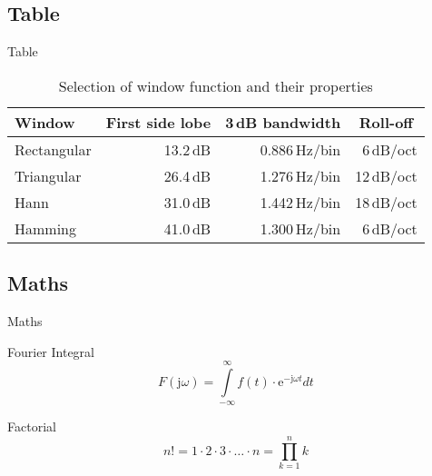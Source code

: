 \documentclass[compress]{beamer}
\begin{document}
\subsection{Table}
\begin{frame}{Table}
\begin{table}[]
	\caption{Selection of window function and their properties}
	\begin{tabular}[]{lrrr}
		\toprule
		\textbf{Window}			& \multicolumn{1}{c}{\textbf{First side lobe}}	
		                    & \multicolumn{1}{c}{\textbf{3\,dB bandwidth}}
		                    & \multicolumn{1}{c}{\textbf{Roll-off}} \\
		\midrule
		Rectangular				& 13.2\,dB	& 0.886\,Hz/bin	& 6\,dB/oct		\\[0.25em]
		Triangular				& 26.4\,dB	& 1.276\,Hz/bin	& 12\,dB/oct	\\[0.25em]
		Hann					& 31.0\,dB	& 1.442\,Hz/bin	& 18\,dB/oct	\\[0.25em]
		Hamming					& 41.0\,dB	& 1.300\,Hz/bin	& 6\,dB/oct		\\
		\bottomrule
	\end{tabular}
	\label{tab:WindowFunctions}
\end{table}
\end{frame}

\subsection{Maths}
\begin{frame}{Maths}
\begin{block}{Fourier Integral}
\begin{equation*}
F(\textrm{j}\omega) = \int\limits_{-\infty}^{\infty} f(t)\cdot\textrm{e}^{-\textrm{j}\omega t} dt
\end{equation*}
\end{block}
\begin{block}{Factorial}
\begin{equation*}
	n! = 1\cdot 2 \cdot 3 \cdot\ldots\cdot n = \prod_{k=1}^n k
\end{equation*}
\end{block}
\end{frame}
\end{document}
